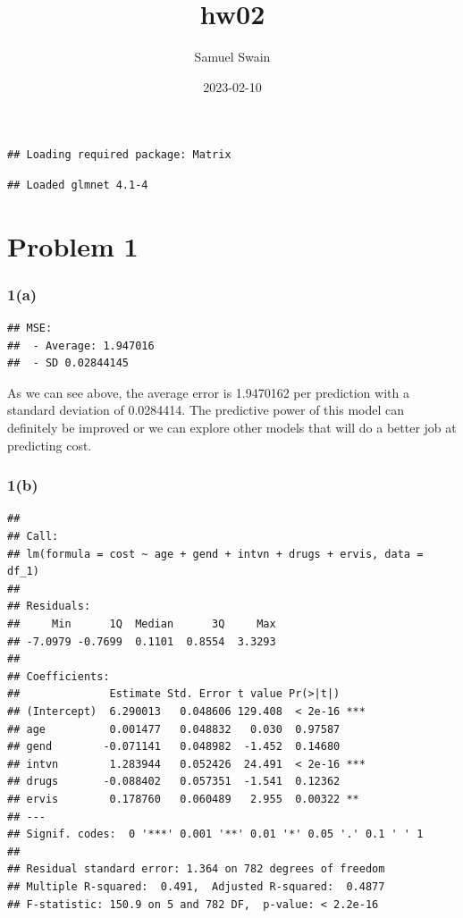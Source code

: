 \documentclass[
]{article}
\title{hw02}
\author{Samuel Swain}
\date{2023-02-10}
\begin{document}
\maketitle

\begin{verbatim}
## Loading required package: Matrix
\end{verbatim}

\begin{verbatim}
## Loaded glmnet 4.1-4
\end{verbatim}

\hypertarget{problem-1}{%
\section{Problem 1}\label{problem-1}}

\hypertarget{a}{%
\subsubsection{1(a)}\label{a}}

\begin{verbatim}
## MSE: 
##  - Average: 1.947016 
##  - SD 0.02844145
\end{verbatim}

As we can see above, the average error is 1.9470162 per prediction with
a standard deviation of 0.0284414. The predictive power of this model
can definitely be improved or we can explore other models that will do a
better job at predicting cost.

\hypertarget{b}{%
\subsubsection{1(b)}\label{b}}

\begin{verbatim}
## 
## Call:
## lm(formula = cost ~ age + gend + intvn + drugs + ervis, data = df_1)
## 
## Residuals:
##     Min      1Q  Median      3Q     Max 
## -7.0979 -0.7699  0.1101  0.8554  3.3293 
## 
## Coefficients:
##              Estimate Std. Error t value Pr(>|t|)    
## (Intercept)  6.290013   0.048606 129.408  < 2e-16 ***
## age          0.001477   0.048832   0.030  0.97587    
## gend        -0.071141   0.048982  -1.452  0.14680    
## intvn        1.283944   0.052426  24.491  < 2e-16 ***
## drugs       -0.088402   0.057351  -1.541  0.12362    
## ervis        0.178760   0.060489   2.955  0.00322 ** 
## ---
## Signif. codes:  0 '***' 0.001 '**' 0.01 '*' 0.05 '.' 0.1 ' ' 1
## 
## Residual standard error: 1.364 on 782 degrees of freedom
## Multiple R-squared:  0.491,  Adjusted R-squared:  0.4877 
## F-statistic: 150.9 on 5 and 782 DF,  p-value: < 2.2e-16
\end{verbatim}
\end{document}

